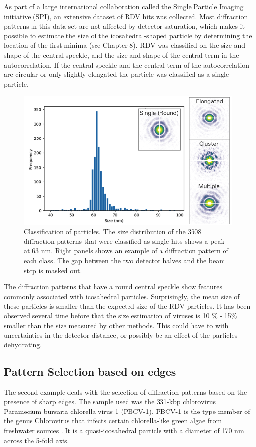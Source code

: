 As part of a large international collaboration called the Single Particle Imaging initiative (SPI)\cite{Aquila2015a}, an extensive dataset of RDV hits was collected. Most diffraction patterns in this data set are not affected by detector saturation, which makes it possible to estimate the size of the icosahedral-shaped particle by determining the location of the first minima (see Chapter 8).
RDV was classified on the size and shape of the central speckle, and the size and shape of the central term in the autocorrelation. If the central speckle and the central term of the autocorrelation are circular or only slightly elongated the particle was classified as a single particle.  

\begin{figure}[!h]
\centering
\includegraphics[width=120mm]{Chapter_09_Results_RDV.png}
\caption{Classification of particles. The size distribution of the 3608 diffraction patterns that were classified as single hits shows a peak at 63 nm. Right panels shows an  example of a diffraction pattern of each class. The gap between the two detector halves and the beam stop is masked out.}\label{fig:Classes}

\end{figure}

The diffraction patterns that have a round central speckle show features commonly associated with icosahedral particles. Surprisingly, the mean size of these particles is smaller than the expected size of the RDV particles. It has been observed several time before that the size estimation of viruses is 10 \% - 15\% smaller than the size measured by other methods. This could have to with uncertainties in the detector distance, or possibly be an effect of the particles dehydrating. 


\subsection{Pattern Selection based on edges}
The second example deals with the selection of diffraction patterns based on the presence of sharp edges. The sample used was the 331-kbp chlorovirus Paramecium bursaria chlorella virus 1 (PBCV-1). PBCV-1 is the type member of the genus Chlorovirus that infects certain chlorella-like green algae from freshwater sources \cite{VanEtten2012}. It is a quasi-icosahedral particle with a diameter of 170 nm across the 5-fold axis.

